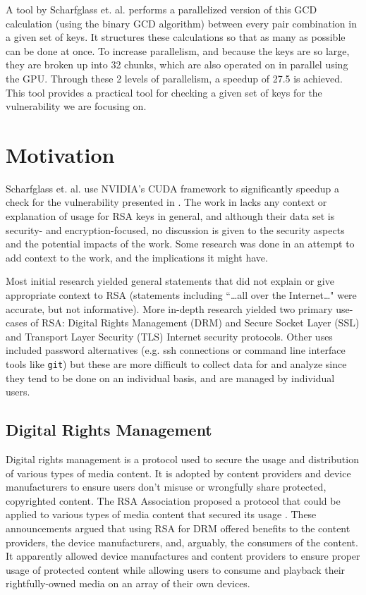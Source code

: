 \documentclass[12pt]{ucthesis}
\begin{document}
A tool by Scharfglass et. al. \cite{scharfglass2012breaking} performs a
parallelized version of this GCD calculation (using the binary GCD algorithm)
between every pair combination in a given set of keys. It structures these
calculations so that as many as possible can be done at once. To increase
parallelism, and because the keys are so large, they are broken up into 32
chunks, which are also operated on in parallel using the GPU. Through these 2
levels of parallelism, a speedup of 27.5 is achieved. This tool provides a
practical tool for checking a given set of keys for the vulnerability we are
focusing on.

\section{Motivation}
Scharfglass et. al. use NVIDIA's CUDA framework to significantly speedup a check for the vulnerability
presented in \cite{lenstra2012ron}. The work in \cite{scharfglass2012breaking}
lacks any context or explanation of usage for RSA keys in general, and although
their data set is security- and encryption-focused, no discussion is given to
the security aspects and the potential impacts of the work. Some research was
done in an attempt to add context to the work, and the implications it might
have.

Most initial research yielded general statements that did not explain or give
appropriate context to RSA (statements including ``\dots all over the
Internet\dots" were accurate, but not informative). More in-depth research
yielded two primary use-cases of RSA: Digital Rights Management (DRM) and
Secure Socket Layer (SSL) and Transport Layer Security (TLS) Internet
security protocols. Other uses included password alternatives (e.g. ssh
connections or command line interface tools like \texttt{git}) but these are
more difficult to collect data for and analyze since they tend to be done on
an individual basis, and are managed by individual users.

\subsection{Digital Rights Management}
Digital rights management is a protocol used to secure the usage and
distribution of various types of media content. It is adopted by content
providers and device manufacturers to ensure users don't misuse or wrongfully 
share protected, copyrighted content.
The RSA Association proposed a protocol that could be applied to various types
of media content that secured its usage \cite{rsa2004announces,
rsa2004supports}. These announcements argued that using RSA for DRM offered
benefits to the content providers, the device manufacturers, and, arguably, the
consumers of the content. It apparently allowed device manufactures and
content providers to ensure proper usage of protected content while allowing
users to consume and playback their rightfully-owned media on an array of
their own devices.
\end{document}

